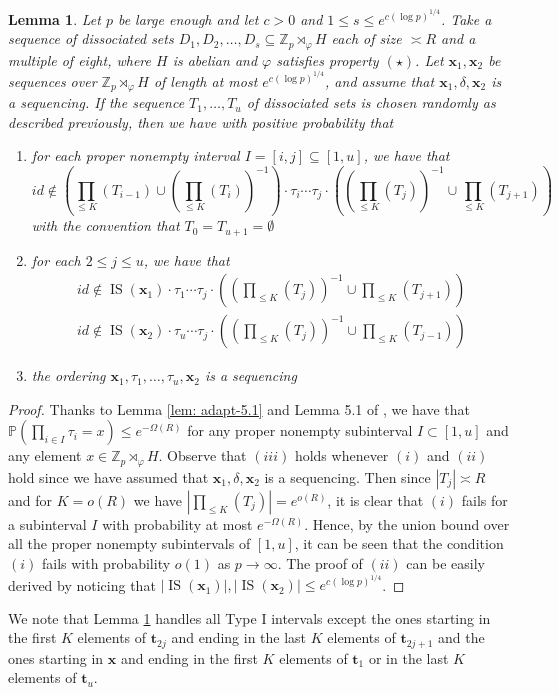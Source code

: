 \documentclass[11pt]{amsart}
\newtheorem{lemma}[theorem]{Lemma}
\theoremstyle{definition}
\DeclareMathOperator{\IS}{IS}
\begin{document}
\begin{lemma}\label{lem: adapt-5.3}
Let $p$ be large enough and let $c>0$ and $1 \leq s \leq e^{c (\log p)^{1/4}}$. Take a sequence of dissociated sets $D_1, D_2, \ldots, D_s \subseteq \mathbb{Z}_{p} \rtimes_{\varphi} H$ each of size $\asymp R$ and a multiple of eight, where $H$ is abelian and $\varphi$ satisfies property $(\star)$. Let $\mathbf{x}_1, \mathbf{x}_2$ be sequences over $\mathbb{Z}_{p} \rtimes_{\varphi} H$ of length at most $e^{c (\log p)^{1/4}}$, and assume that $\mathbf{x}_1, \delta, \mathbf{x}_2$ is a sequencing. If the sequence $T_1, \ldots, T_u$ of dissociated sets is chosen randomly as described previously, then we have with positive probability that
\begin{enumerate}
\item[$(i)$] for each proper nonempty interval $I=[i,j] \subseteq [1,u]$, we have that
$$
	id \not \in \left( \prod_{\leq K} (T_{i-1}) \cup \left(\prod_{\leq K} (T_i) \right)^{-1} \right) \cdot \tau_i \cdots \tau_j \cdot  \left(\left(\prod_{\leq K} (T_{j})\right)^{-1} \cup \prod_{\leq K} (T_{j+1}) \right)
$$
with the convention that $T_0 = T_{u+1} = \emptyset$
\item[$(ii)$] for each $2 \leq j \leq u$, we have that
\begin{align*}
id \not \in \IS (\mathbf{x}_1) \cdot \tau_1 \cdots \tau_j \cdot \left(\left(\prod_{\leq K} (T_{j})\right)^{-1} \cup \prod_{\leq K} (T_{j+1}) \right) \\
id \not \in \IS (\mathbf{x}_2) \cdot \tau_u \cdots \tau_j \cdot \left(\left(\prod_{\leq K} (T_{j})\right)^{-1} \cup \prod_{\leq K} (T_{j-1}) \right)
\end{align*}
\item[$(iii)$] the ordering $\mathbf{x}_1, \tau_1, \ldots, \tau_u, \mathbf{x}_2$ is a sequencing
\end{enumerate}
\end{lemma}
\begin{proof}
Thanks to Lemma \ref{lem: adapt-5.1} and Lemma 5.1 of \cite{BK}, we have that $\mathbb{P}(\prod_{i \in I} \tau_i = x) \leq e^{-\Omega(R)}$ for any proper nonempty subinterval $I \subset [1, u]$ and any element $x \in \mathbb{Z}_{p} \rtimes_{\varphi} H$. Observe that $(iii)$ holds whenever $(i)$ and $(ii)$ hold since we have assumed that $\mathbf{x}_1, \delta, \mathbf{x}_2$ is a sequencing. Then since $|T_j| \asymp R$ and for $K=o(R)$ we have $|\prod_{\leq K} (T_{j})| = e^{o(R)}$, it is clear that $(i)$ fails for a subinterval $I$ with probability at most $e^{-\Omega(R)}$. Hence, by the union bound over all the proper nonempty subintervals of $[1,u]$, it can be seen that the condition $(i)$ fails with probability $o(1)$ as $p \to \infty$. The proof of $(ii)$ can be easily derived by noticing that $|\IS(\mathbf{x}_1)|, |\IS(\mathbf{x}_2)| \leq e^{c (\log p)^{1/4}}$.
\end{proof}
We note that Lemma \ref{lem: adapt-5.3} handles all Type I intervals except the ones starting in the first $K$ elements of $\mathbf{t}_{2j}$ and ending in the last $K$ elements of $\mathbf{t}_{2j+1}$ and the ones starting in $\mathbf{x}$ and ending in the first $K$ elements of $\mathbf{t}_1$ or in the last $K$ elements of $\mathbf{t}_u$.
\end{document}
